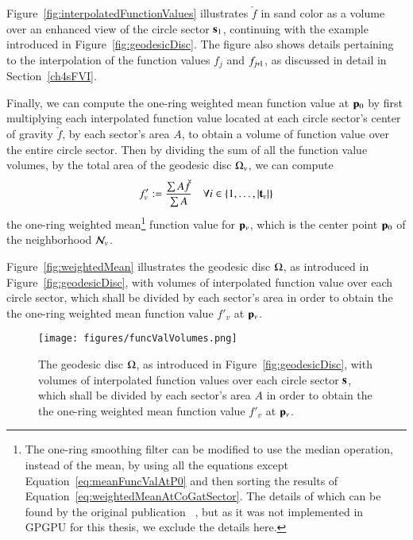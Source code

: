 Figure~\ref{fig:interpolatedFunctionValues} illustrates $\check{f}$ in sand color as a volume over an enhanced view of the circle sector $\mathbf{s}_1$, continuing with the example introduced in Figure~\ref{fig:geodesicDisc}. The figure also shows details pertaining to the interpolation of the function values $f_j$ and $f_{\sjpo}$, as discussed in detail in Section~\ref{ch4sFVI}.

Finally, we can compute the one-ring weighted mean function value at $\mathbf{p}_0$ by first multiplying each interpolated function value located at each circle sector's center of gravity $\check{f}$, by each sector's area $A$, to obtain a volume of function value over the entire circle sector. Then by dividing the sum of all the function value volumes, by the total area of the geodesic disc $\Omega_v$, we can compute
\begin{equation}
	f'_v := \frac{\sum A\check{f}}{\sum A} \quad \forall i \in \{1,\ldots,|\mathbf{t}_v|\}
	\label{eq:meanFuncValAtPv}
\end{equation}%
%
the one-ring weighted mean\footnote{The one-ring smoothing filter can be modified to use the median operation, instead of the mean, by using all the equations except Equation~\ref{eq:meanFuncValAtP0} and then sorting the results of Equation~\ref{eq:weightedMeanAtCoGatSector}. The details of which can be found by the original publication ~\cite[s.~3.2]{Mara17}, but as it was not implemented in GPGPU for this thesis, we exclude the details here.} function value for $\bp_v$, which is the center point $\mathbf{p}_0$ of the neighborhood $\mathcal{N}_v$.

Figure~\ref{fig:weightedMean} illustrates the geodesic disc $\Omega$, as introduced in Figure~\ref{fig:geodesicDisc}, with volumes of interpolated function value over each circle sector, which shall be divided by each sector's area in order to obtain the the one-ring weighted mean function value $f'_v$ at $\bp_v$.
\begin{figure}[ht]
\ffigbox
	{\texttt{[image: figures/funcValVolumes.png]}}
	{\caption[Weighted Mean Function Value $f'_v$at $\bp_v$]{The geodesic disc $\Omega$, as introduced in Figure~\ref{fig:geodesicDisc}, with volumes of interpolated function values over each circle sector $\mathbf{s}$, which shall be divided by each sector's area $A$ in order to obtain the the one-ring weighted mean function value $f'_v$ at $\bp_v$.}\label{fig:funcValVolumes}}
\end{figure}
%
